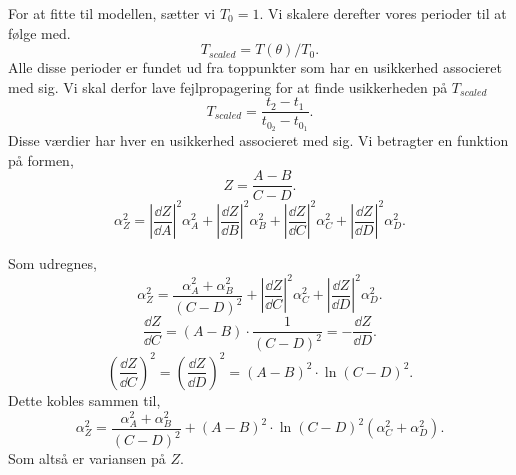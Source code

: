 \begin{solution}
For at fitte til modellen, sætter vi $T_0 = 1$. Vi skalere derefter vores perioder til at følge med.
 \[
T_{scaled} = T\left( \theta \right) / T_0
.\] 
Alle disse perioder er fundet ud fra toppunkter som har en usikkerhed associeret med sig. Vi skal derfor lave fejlpropagering for at finde usikkerheden på $T_{scaled}$ 
\[
T_{scaled} = \frac{t_2-t_1}{t_0_2 - t_0_1}
.\]
Disse værdier har hver en usikkerhed associeret med sig. Vi betragter en funktion på formen,
\[
Z = \frac{A-B}{C-D}
.\] 
\[
\alpha _Z^2 =  \left| \frac{\dd Z}{\dd A}\right|^2\alpha _A^2 +\left| \frac{\dd Z}{\dd B}\right|^2\alpha _B^2+ \left| \frac{\dd Z}{\dd C}\right|^2\alpha _C^2+\left| \frac{\dd Z}{\dd D}\right|^2\alpha _D^2
.\] 
\end{solution}
Som udregnes,
\[
	\alpha _Z^2 = \frac{\alpha _A^2 + \alpha _B^2}{(C-D)^2}+\left| \frac{\dd Z}{\dd C}\right|^2\alpha _C^2+\left| \frac{\dd Z}{\dd D}\right|^2\alpha _D^2
.\]
\[
	\frac{\dd Z}{\dd C} = \left( A - B \right) \cdot \frac{1}{(C-D)^2} = - \frac{\dd Z}{\dd D}
.\] 
\[
	\left( \frac{\dd Z}{\dd C} \right) ^2 = \left( \frac{\dd Z}{\dd D} \right) ^2 = \left( A - B \right) ^2 \cdot \ln \left( C-D \right) ^2
.\] 
Dette kobles sammen til,
\[
\alpha _Z^2 = \frac{\alpha _A^2+\alpha _B^2}{\left( C-D \right) ^2} + \left( A-B \right) ^2\cdot \ln\left( C-D \right) ^2\left( \alpha _C^2 + \alpha _D^2 \right) 
.\]
Som altså er variansen på $Z$. 


